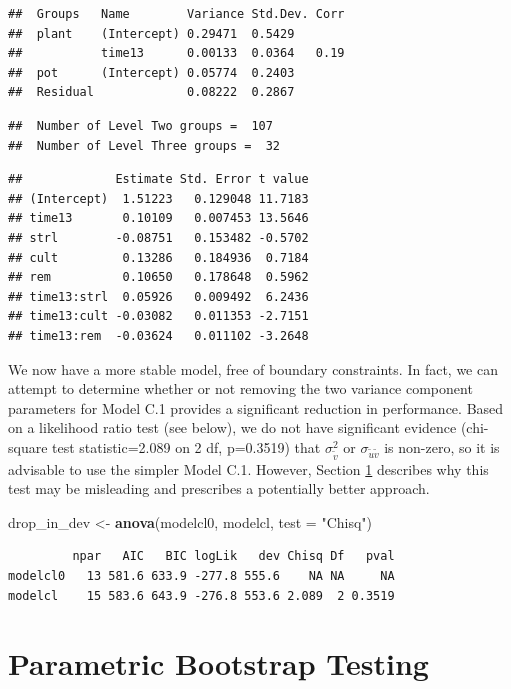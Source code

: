 \documentclass[
]{krantz}
\newenvironment{Shaded}{\begin{snugshade}}{\end{snugshade}}
\newcommand{\AttributeTok}[1]{\textcolor[rgb]{0.27,0.27,0.27}{#1}}
\newcommand{\FunctionTok}[1]{\textcolor[rgb]{0.27,0.27,0.27}{\textbf{#1}}}
\newcommand{\NormalTok}[1]{#1}
\newcommand{\OtherTok}[1]{\textcolor[rgb]{0.37,0.37,0.37}{#1}}
\newcommand{\StringTok}[1]{\textcolor[rgb]{0.5,0.5,0.5}{#1}}
\begin{document}
\begin{verbatim}
##  Groups   Name        Variance Std.Dev. Corr
##  plant    (Intercept) 0.29471  0.5429       
##           time13      0.00133  0.0364   0.19
##  pot      (Intercept) 0.05774  0.2403       
##  Residual             0.08222  0.2867
\end{verbatim}

\begin{verbatim}
##  Number of Level Two groups =  107 
##  Number of Level Three groups =  32
\end{verbatim}

\begin{verbatim}
##             Estimate Std. Error t value
## (Intercept)  1.51223   0.129048 11.7183
## time13       0.10109   0.007453 13.5646
## strl        -0.08751   0.153482 -0.5702
## cult         0.13286   0.184936  0.7184
## rem          0.10650   0.178648  0.5962
## time13:strl  0.05926   0.009492  6.2436
## time13:cult -0.03082   0.011353 -2.7151
## time13:rem  -0.03624   0.011102 -3.2648
\end{verbatim}

We now have a more stable model, free of boundary constraints. In fact, we can attempt to determine whether or not removing the two variance component parameters for Model C.1 provides a significant reduction in performance. Based on a likelihood ratio test (see below), we do not have significant evidence (chi-square test statistic=2.089 on 2 df, p=0.3519) that \(\sigma_{\tilde{v}}^{2}\) or \(\sigma_{\tilde{u}\tilde{v}}\) is non-zero, so it is advisable to use the simpler Model C.1. However, Section \ref{threelevel-paraboot} describes why this test may be misleading and prescribes a potentially better approach.

\begin{Shaded}
\begin{Highlighting}[]
\NormalTok{drop\_in\_dev }\OtherTok{\textless{}{-}} \FunctionTok{anova}\NormalTok{(modelcl0, modelcl, }\AttributeTok{test =} \StringTok{"Chisq"}\NormalTok{)}
\end{Highlighting}
\end{Shaded}

\begin{verbatim}
         npar   AIC   BIC logLik   dev Chisq Df   pval
modelcl0   13 581.6 633.9 -277.8 555.6    NA NA     NA
modelcl    15 583.6 643.9 -276.8 553.6 2.089  2 0.3519
\end{verbatim}

\section{Parametric Bootstrap Testing}\label{threelevel-paraboot}
\end{document}
